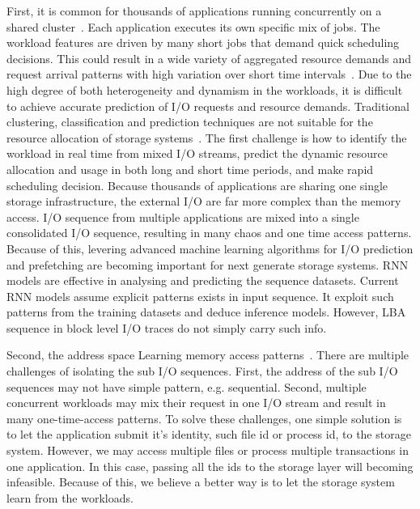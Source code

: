 First, it is common for thousands of applications running concurrently
on a shared cluster~\cite{stokely2012projecting}.
Each application executes its own specific mix of jobs.
The workload features are driven by many short jobs
that demand quick scheduling decisions.
This could result in a wide variety of aggregated resource demands and
request arrival patterns with high variation over short time intervals~\cite{reiss2012heterogeneity}.
Due to the high degree of both heterogeneity and dynamism in the workloads,
it is difficult to achieve accurate prediction of I/O requests and resource demands.
Traditional clustering, classification and prediction techniques
are not suitable for the resource allocation of storage systems~\cite{ray2017high}.
The first challenge is how to identify the workload in real time from mixed I/O streams,
predict the dynamic resource allocation and usage in both long and short time periods,
and make rapid scheduling decision.
Because thousands of applications are sharing one single storage infrastructure,
the external I/O are far more complex than the memory access.
I/O sequence from multiple applications are mixed into a single consolidated I/O sequence,
resulting in many chaos and one time access patterns.
Because of this, levering advanced machine learning algorithms for I/O prediction and prefetching
are becoming important for next generate storage systems.
RNN models are effective in analysing and predicting the sequence datasets.
Current RNN models assume explicit patterns exists in input sequence.
It exploit such patterns from the training datasets and deduce inference models.
However, LBA sequence in block level I/O traces do not simply carry such info.



Second, the address space
Learning memory access patterns~\cite{hashemi2018learning, peled2018towards}.
There are multiple challenges of isolating the sub I/O sequences.
First, the address of the sub I/O sequences may not have simple pattern, e.g. sequential.
Second, multiple concurrent workloads may mix their request in one I/O stream and result in many one-time-access patterns.
To solve these challenges, one simple solution is to let the application submit it's identity, such file id or process id, to the storage system.
However, we may access multiple files or process multiple transactions in one application.
In this case, passing all the ids to the storage layer will becoming infeasible.
Because of this, we believe a better way is to let the storage system learn from the workloads.

